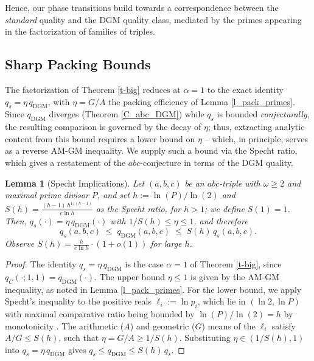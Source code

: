 \documentclass[11pt,letterpaper]{amsart}
\newtheorem{lemma}[theorem]{Lemma}
\begin{document}
Hence, our phase transitions build towards a correspondence between the \textit{standard} quality and the DGM quality class, mediated by the primes appearing in the factorization of families of triples.

\subsection{Sharp Packing Bounds}
  \label{S_packing_abc}

  The factorization of Theorem \ref{t-big} reduces at $\alpha=1$ to the exact identity
  $q_s = \eta\,q_{\mathrm{DGM}}$, with $\eta=G/A$ the packing efficiency of Lemma \ref{l_pack_primes}. Since $q_{\mathrm{DGM}}$ diverges (Theorem \ref{C_abc_DGM}) while $q_s$
  is bounded \textit{conjecturally}, the resulting comparison is governed by the decay of $\eta$; thus, extracting analytic content from this bound requires a lower bound on $\eta$ – which, in principle, serves as a reverse AM-GM inequality. We supply such a bound via the Specht ratio, which gives a restatement of the $abc$-conjecture in terms of the DGM quality.

  \begin{lemma}[Specht Implications]\label{T_specht}
  Let $(a,b,c)$ be an $abc$-triple with $\omega\ge 2$ and maximal prime divisor $P$,
  and set $h:=\ln(P)/\ln (2)$ and $S(h) = \frac{(h-1)\,h^{1/(h-1)}}{e\ln h}$ as the Specht ratio, for $h > 1$; we define $S(1) = 1$. Then, $q_s(\cdot) = \eta\,q_{\mathrm{DGM}}(\cdot)$ with $1/S(h)\le \eta\le 1$, and therefore
  \[
      q_s(a,b,c)\;\le\; q_{\mathrm{DGM}}(a,b,c)\;\le\; S(h)\,q_s(a,b,c).
  \]
  Observe $S(h)=\frac{h}{e\ln h} \cdot (1+o(1))$ for large $h$.
  \end{lemma}

  \begin{proof}
  The identity $q_s=\eta\,q_{\mathrm{DGM}}$ is the case $\alpha=1$ of Theorem \ref{t-big}, since $q_C(\cdot;1,1)=q_{\mathrm{DGM}}(\cdot)$. The upper
  bound $\eta\le 1$ is given by the AM-GM inequality, as noted in Lemma
  \ref{l_pack_primes}. For the lower bound, we apply Specht's inequality to the
  positive reals $\ell_i := \ln p_i$, which lie in $(\ln 2,\ln P)$ with maximal comparative ratio being bounded by $\ln(P)/\ln(2) = h$ by monotonicity \cite{specht1960theorie}. The arithmetic ($A$) and geometric ($G$) means of the $\ell_i$ satisfy $A/G \leq S(h)$, such that $\eta = G/A \ge 1/S(h)$. Substituting $\eta\in(1/S(h),1)$ into $q_s=\eta\,q_{\mathrm{DGM}}$ gives $q_s\le q_{\mathrm{DGM}}\le S(h)\,q_s$.
  \end{proof}
\end{document}
